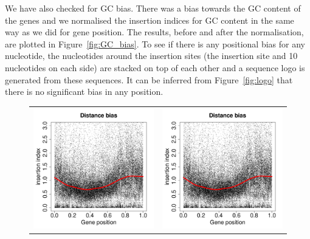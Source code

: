 \documentclass[a4paper,10pt, twocolumn]{article}
\begin{document}
We have also checked for GC bias. There was a bias towards the GC content of the genes and we normalised the insertion indices for GC content in the same way as we did for gene position. The results, before and after the normalisation, are plotted in Figure~\ref{fig:GC_bias}. To see if there is any positional bias for any nucleotide, the nucleotides around the insertion sites (the insertion site and 10 nucleotides on each side) are stacked on top of each other and a sequence logo is generated from these sequences. It can be inferred from Figure~\ref{fig:logo} that there is no significant bias in any position.

\begin{figure}
\centering
\begin{tabular}{c c}
\includegraphics[scale=0.35, page=26]{biases.pdf} &
\includegraphics[scale=0.35, page=27]{biases.pdf}

\end{tabular}
\end{figure}
\end{document}
